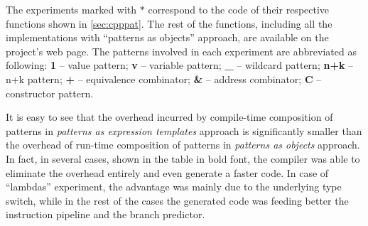 %

The experiments marked with $*$ correspond to the code of their respective 
functions shown in \textsection\ref{sec:cpppat}. The rest of the functions, 
including all the implementations with ``patterns as objects'' approach, are 
available on the project's web page. The patterns involved in each experiment are abbreviated as following:
{\bf 1}   -- value pattern;
{\bf v}   -- variable pattern;
{\bf \_}  -- wildcard pattern;
{\bf n+k} -- n+k pattern;
{\bf +}   -- equivalence combinator;
{\bf \&}  -- address combinator;
{\bf C}   -- constructor pattern.


It is easy to see that the overhead incurred by compile-time composition of 
patterns in \emph{patterns as expression templates} approach is significantly 
smaller than the overhead of run-time composition of patterns in \emph{patterns 
as objects} approach. In fact, in several cases, shown in the table in bold 
font, the compiler was able to eliminate the overhead entirely and even generate 
a faster code. In case of ``lambdas'' experiment, the advantage was mainly due 
to the underlying type switch, while in the rest of the cases the generated code
was feeding better the instruction pipeline and the branch predictor.

